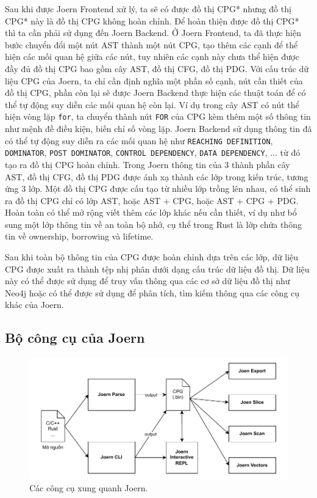 Sau khi được Joern Frontend xử lý, ta sẽ có được đồ thị CPG* nhưng đồ thị CPG* này là đồ thị CPG không hoàn chỉnh.
Để hoàn thiện được đồ thị CPG* thì ta cần phải sử dụng đến Joern Backend.
Ở Joern Frontend, ta đã thực hiện bước chuyển đổi một nút AST thành một nút CPG, tạo thêm các cạnh để thể hiện các mối quan hệ giữa các nút, tuy nhiên các cạnh này chưa thể hiện được đầy đủ đồ thị CPG bao gồm cây AST, đồ thị CFG, đồ thị PDG.
Với cấu trúc dữ liệu CPG của Joern, ta chỉ cần định nghĩa một phần số cạnh, nút cần thiết của đồ thị CPG, phần còn lại sẽ được Joern Backend thực hiện các thuật toán để có thể tự động suy diễn các mối quan hệ còn lại.
Ví dụ trong cây AST có nút thể hiện vòng lặp \texttt{for}, ta chuyển thành nút \texttt{FOR} của CPG kèm thêm một số thông tin như mệnh đề điều kiện, biến chỉ số vòng lặp.
Joern Backend sử dụng thông tin đã có thể tự động suy diễn ra các mối quan hệ như \texttt{REACHING DEFINITION}, \texttt{DOMINATOR}, \texttt{POST DOMINATOR}, \texttt{CONTROL DEPENDENCY}, \texttt{DATA DEPENDENCY}, ...
từ đó tạo ra đồ thị CPG hoàn chỉnh.
Trong Joern thông tin của 3 thành phần cây AST, đồ thị CFG, đồ thị PDG được ánh xạ thành các lớp trong kiến trúc, tương ứng 3 lớp.
Một đồ thị CPG được cấu tạo từ nhiều lớp trồng lên nhau, có thể sinh ra đồ thị CPG chỉ có lớp AST, hoặc AST + CPG, hoặc AST + CPG + PDG.
Hoàn toàn có thể mở rộng viết thêm các lớp khác nếu cần thiết, ví dụ như bổ sung một lớp thông tin về an toàn bộ nhớ, cụ thể trong Rust là lớp chứa thông tin về ownership, borrowing và lifetime.

Sau khi toàn bộ thông tin của CPG được hoàn chỉnh dựa trên các lớp, dữ liệu CPG được xuất ra thành tệp nhị phân dưới dạng cấu trúc dữ liệu đồ thị.
Dữ liệu này có thể được sử dụng để truy vấn thông qua các cơ sở dữ liệu đồ thị như Neo4j \cite{miller2013graph} hoặc có thể được sử dụng để phân tích, tìm kiếm thông qua các công cụ khác của Joern.

\subsection{Bộ công cụ của Joern}

\begin{figure}[H]
  \includegraphics[width=1\columnwidth]{figures/c2/c2_joern_tools.drawio.pdf}
  \centering
  \caption{Các công cụ xung quanh Joern.}
  \label{img:c2_joern_tools}
\end{figure}

